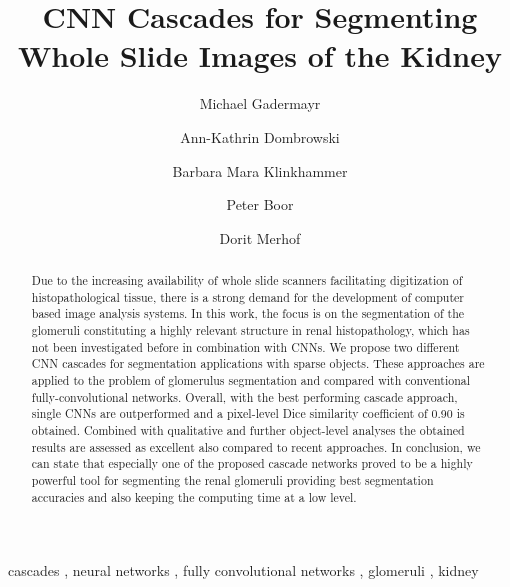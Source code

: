 \documentclass{elsarticle}
\begin{document}
	
	\begin{frontmatter}
		
		\author[lfb,cor]{Michael Gadermayr}
		\author[lfb]{Ann-Kathrin Dombrowski}
		\author[neuro]{Barbara Mara Klinkhammer}
		\author[neuro]{Peter Boor}
		\author[lfb]{Dorit Merhof}
		\address[lfb]{Institute of Imaging \& Computer Vision, RWTH Aachen University, Aachen, Germany}
		\address[neuro]{Institute of Pathology, University Hospital Aachen, RWTH Aachen University, Aachen, Germany}
		\address[cor]{Corresponding author: M. Gadermayr, \url{Michael.Gadermayr@lfb.rwth-aachen.de}, Kopernikusstr. 16, 52074 Aachen, Germany}
		
		\title{CNN Cascades for Segmenting \\Whole Slide Images of the Kidney}
			
			\begin{abstract}
				\noindent
				Due to the increasing availability of whole slide scanners facilitating digitization of histopathological tissue, there is a strong demand for the development of computer based image analysis systems.
				In this work, the focus is on the segmentation of the glomeruli constituting a highly relevant structure in renal histopathology, which has not been investigated before in combination with CNNs.
				We propose two different CNN cascades for segmentation applications with sparse objects. These approaches are applied to the problem of glomerulus segmentation and compared with conventional fully-convolutional networks.
				Overall, with the best performing cascade approach, single CNNs are outperformed and a pixel-level Dice similarity coefficient of 0.90 is obtained.
				Combined with qualitative and further object-level analyses the obtained results are assessed as excellent also compared to recent approaches.
				In conclusion, we can state that especially one of the proposed cascade networks proved to be a highly powerful tool for segmenting the renal glomeruli providing best segmentation accuracies and also keeping the computing time at a low level. %
			\end{abstract}

			\begin{keyword}
				{cascades} \sep
				{neural networks} \sep
				{fully convolutional networks} \sep
				{glomeruli} \sep
				{kidney}
			\end{keyword}
			
	\end{frontmatter}
\end{document}
